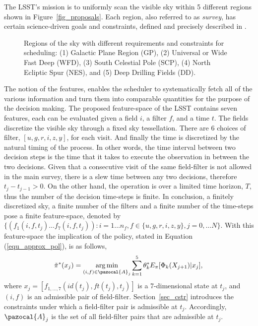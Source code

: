 \documentclass[12pt]{aastex62}
\theoremstyle{definition}
\DeclareMathOperator*{\argmin}{arg\,min}
\begin{document}
The LSST's mission is to uniformly scan the visible sky within 5 different regions shown in Figure~\ref{fig_proposals}. Each region, also referred to as \textit{survey}, has certain science-driven goals and constraints, defined and precisely described in \citep{ivezic2008large}.  
%
\begin{figure}[h!]
\begin{center}
\caption{Regions of the sky with different requirements and constraints for scheduling: (1) Galactic Plane Region (GP), (2) Universal or Wide Fast Deep (WFD), (3) South Celestial Pole (SCP), (4) North Ecliptic Spur (NES), and (5) Deep Drilling Fields (DD).}
\end{center}
\end{figure}\label{fig_proposals}
%
The notion of the features, enables the scheduler to systematically fetch all of the various information and turn them into comparable quantities for the purpose of the decision making. The proposed feature-space of the LSST contains seven features, each can be evaluated given a field $i$, a filter $f$, and a time $t$. The fields discretize the visible sky through a fixed sky tessellation. There are 6 choices of filter, $[u,g,r,i,z,y]$, for each visit. And finally the time is discretized by the natural timing of the process. In other words, the time interval between two decision steps is the time that it takes to execute the observation in between the two decisions. Given that a consecutive visit of the same field-filter is not allowed in the main survey, there is a slew time between any two decisions, therefore $t_{j} - t_{j-1} > 0$. On the other hand, the operation is over a limited time horizon, $T$, thus the number of the decision time-steps is finite. In conclusion, a finitely discretized sky, a finite number of the filters and a finite number of the time-steps pose a finite feature-space, denoted by $\{(f_1(i,f,t_j)\dots f_7(i,f,t_j)): i = 1\dots n_f, f\in \{u,g,r,i,z,y\}, j = 0,\dots N\}$. With this feature-space the implication of the policy, stated in Equation (\ref{equ_approx_pol}), is as follows,
%
\begin{equation}\label{equ_approx_pol_imp}
\tilde{\pi}^*(x_j)= \argmin_{(i,f)\in \pazocal{A}_{j}} \sum_{k=1}^5 \theta^*_k E_{\pi}[\Phi_k(X_{j+1}) | x_j],\\
\end{equation}
%
where $x_j = [f_{1, \dots,7}(id(t_j),ft(t_j),t_j)]$ is a 7-dimensional state at $t_j$, and $(i,f)$ is an admissible pair of field-filter. Section~\ref{sec_cstr} introduces the constraints under which a field-filter pair is admissible at $t_{j}$. Accordingly, $\pazocal{A}_j$ is the set of all field-filter pairs that are admissible at $t_j$.
\end{document}
